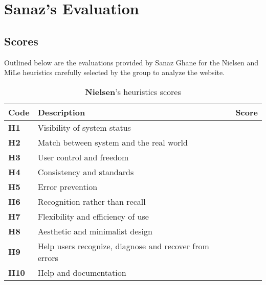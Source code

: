 
\section{Sanaz's Evaluation}
\subsection{Scores}
Outlined below are the evaluations provided by Sanaz Ghane for the Nielsen and MiLe heuristics carefully selected by the group to analyze the website.\\
\begin{table}[htp!]
    \centering
    \begin{tabular}{ |l|l|c| }
        \hline
        \textbf{Code} & \textbf{Description} & \textbf{Score}\\
        \hline
        \textbf{H1} & Visibility of system status & \textbf{\color{unicefOrange}{3.5}}\\
        \hline
        \textbf{H2} & Match between system and the real world & \textbf{\color{unicefGreen}{4}}\\
        \hline
        \textbf{H3} & User control and freedom & \textbf{\color{unicefOrange}{4}}\\
        \hline
        \textbf{H4} & Consistency and standards & \textbf{\color{unicefGreen}{4}}\\
        \hline
        \textbf{H5} & Error prevention & \textbf{\color{unicefGreen}{4.5}}\\
        \hline
        \textbf{H6} & Recognition rather than recall & \textbf{\color{unicefGreen}{4.5}}\\
        \hline
        \textbf{H7} & Flexibility and efficiency of use & \textbf{\color{unicefOrange}{3.5}}\\
        \hline
        \textbf{H8} & Aesthetic and minimalist design & \textbf{\color{unicefGreen}{4}}\\
        \hline
        \textbf{H9} & Help users recognize, diagnose and recover from errors & \textbf{\color{unicefGreen}{4.5}}\\
        \hline
        \textbf{H10} & Help and documentation & \textbf{\color{unicefGreen}{4}}\\
        \hline
    \end{tabular}
    \caption{\textbf{Nielsen}'s heuristics scores}
\end{table}
